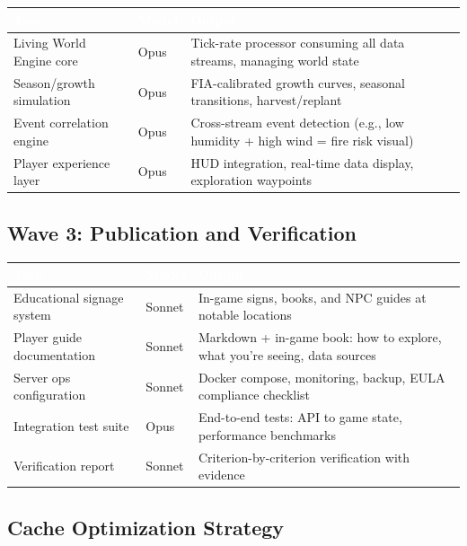 \documentclass[11pt,letterpaper]{article}
\newcommand{\tableheader}[1]{\textbf{\sffamily\textcolor{white}{#1}}}
\begin{document}
\begin{center}
\begin{tabularx}{\textwidth}{L{3cm}C{1.5cm}X}
\toprule
{}
\tableheader{Task} & \tableheader{Model} & \tableheader{Output} \\
\midrule
Living World Engine core & Opus & Tick-rate processor consuming all data streams, managing world state \\
Season/growth simulation & Opus & FIA-calibrated growth curves, seasonal transitions, harvest/replant \\
Event correlation engine & Opus & Cross-stream event detection (e.g., low humidity + high wind = fire risk visual) \\
Player experience layer & Opus & HUD integration, real-time data display, exploration waypoints \\
\bottomrule
\end{tabularx}
\end{center}

\subsection{Wave 3: Publication and Verification}

\begin{center}
\begin{tabularx}{\textwidth}{L{3cm}C{1.5cm}X}
\toprule
{}
\tableheader{Task} & \tableheader{Model} & \tableheader{Output} \\
\midrule
Educational signage system & Sonnet & In-game signs, books, and NPC guides at notable locations \\
Player guide documentation & Sonnet & Markdown + in-game book: how to explore, what you're seeing, data sources \\
Server ops configuration & Sonnet & Docker compose, monitoring, backup, EULA compliance checklist \\
Integration test suite & Opus & End-to-end tests: API to game state, performance benchmarks \\
Verification report & Sonnet & Criterion-by-criterion verification with evidence \\
\bottomrule
\end{tabularx}
\end{center}

\subsection{Cache Optimization Strategy}
\end{document}
